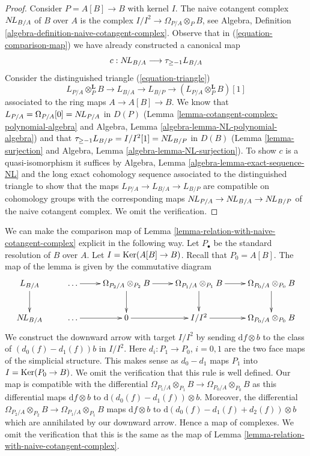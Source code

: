 \begin{proof}
Consider $P = A[B] \to B$ with kernel $I$. The naive cotangent
complex $\mathop{N\!L}\nolimits_{B/A}$ of $B$ over $A$ is the complex
$I/I^2 \to \Omega_{P/A} \otimes_P B$,
see Algebra, Definition \ref{algebra-definition-naive-cotangent-complex}.
Observe that in (\ref{equation-comparison-map}) we have already
constructed a canonical map
$$
c : \mathop{N\!L}\nolimits_{B/A} \longrightarrow \tau_{\geq -1}L_{B/A}
$$
Consider the distinguished triangle (\ref{equation-triangle})
$$
L_{P/A} \otimes_P^\mathbf{L} B \to L_{B/A} \to L_{B/P} \to 
(L_{P/A} \otimes_P^\mathbf{L} B)[1]
$$
associated to the ring maps $A \to A[B] \to B$. We know that
$L_{P/A} = \Omega_{P/A}[0] = \mathop{N\!L}\nolimits_{P/A}$ in $D(P)$
(Lemma \ref{lemma-cotangent-complex-polynomial-algebra}
and
Algebra, Lemma \ref{algebra-lemma-NL-polynomial-algebra})
and that
$\tau_{\geq -1}L_{B/P} = I/I^2[1] = \mathop{N\!L}\nolimits_{B/P}$ in $D(B)$
(Lemma \ref{lemma-surjection} and
Algebra, Lemma \ref{algebra-lemma-NL-surjection}).
To show $c$ is a quasi-isomorphism it suffices by
Algebra, Lemma \ref{algebra-lemma-exact-sequence-NL}
and the long exact cohomology sequence associated to the
distinguished triangle
to show that the maps $L_{P/A} \to L_{B/A} \to L_{B/P}$ are compatible
on cohomology groups with the corresponding maps
$\mathop{N\!L}\nolimits_{P/A} \to \mathop{N\!L}\nolimits_{B/A} \to \mathop{N\!L}\nolimits_{B/P}$
of the naive cotangent complex. We omit the verification.
\end{proof}

\begin{remark}
\label{remark-explicit-comparison-map}
We can make the comparison map of
Lemma \ref{lemma-relation-with-naive-cotangent-complex}
explicit in the following way.
Let $P_\bullet$ be the standard resolution of $B$
over $A$.
Let $I = \mathop{\mathrm{Ker}}(A[B] \to B)$.
Recall that $P_0 = A[B]$. The map of the
lemma is given by the commutative diagram
$$
\xymatrix{
L_{B/A} \ar[d] & \ldots \ar[r] &
\Omega_{P_2/A} \otimes_{P_2} B
\ar[r] \ar[d] &
\Omega_{P_1/A} \otimes_{P_1} B
\ar[r] \ar[d] &
\Omega_{P_0/A} \otimes_{P_0} B
\ar[d] \\
\NL_{B/A} & \ldots \ar[r] &
0 \ar[r] & 
I/I^2 \ar[r] &
\Omega_{P_0/A} \otimes_{P_0} B
}
$$
We construct the downward arrow with target $I/I^2$
by sending $\text{d}f \otimes b$ to the class of
$(d_0(f) - d_1(f))b$ in $I/I^2$. Here $d_i : P_1 \to P_0$,
$i = 0, 1$ are the two face maps of the simplicial structure.
This makes sense as $d_0 - d_1$ maps $P_1$ into $I = \mathop{\mathrm{Ker}}(P_0 \to B)$.
We omit the verification that this rule is well defined.
Our map is compatible with the differential
$\Omega_{P_1/A} \otimes_{P_1} B \to \Omega_{P_0/A} \otimes_{P_0} B$
as this differential maps $\text{d}f \otimes b$ to
$\text{d}(d_0(f) - d_1(f)) \otimes b$. Moreover, the differential
$\Omega_{P_2/A} \otimes_{P_2} B \to \Omega_{P_1/A} \otimes_{P_1} B$
maps $\text{d}f \otimes b$ to $\text{d}(d_0(f) - d_1(f) + d_2(f)) \otimes b$
which are annihilated by our downward arrow. Hence a map of complexes.
We omit the verification that this is the same as the map of
Lemma \ref{lemma-relation-with-naive-cotangent-complex}.
\end{remark}

